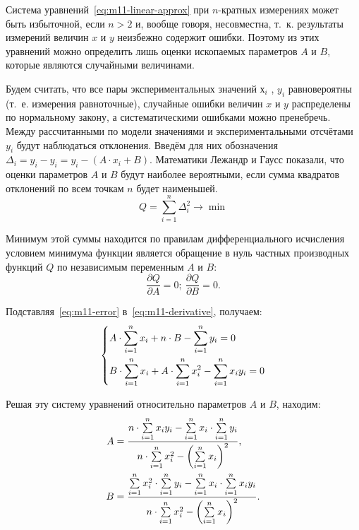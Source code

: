 \documentclass[a4paper, 12pt]{extarticle}
\newcommand{\isum}{\sum\limits_{i=1}^{n}}
\begin{document}
Система уравнений~\eqref{eq:m11-linear-approx} при $n$-кратных измерениях может быть избыточной, если $n >2$ и, вообще говоря, несовместна, т.~к. результаты измерений величин $x$ и $y$ неизбежно содержит ошибки. Поэтому из этих уравнений можно определить лишь оценки ископаемых параметров $A$ и $B$, которые являются случайными величинами. %

Будем считать, что все пары экспериментальных значений $х_i$ , $y_i$  равновероятны (т.~е. измерения равноточные), случайные ошибки величин $x$ и $y$ распределены по нормальному закону, а систематическими ошибками можно пренебречь. Между рассчитанными по модели значениями и экспериментальными отсчётами $y_i$ будут наблюдаться отклонения. Введём для них обозначения $\Delta_i = y_i - y_i = y_i - (A \cdot x_i + B)$. %
Математики Лежандр и Гаусс показали, что оценки параметров $A$ и $B$ будут наиболее вероятными, если сумма квадратов отклонений по всем точкам $n$ будет наименьшей. %
\begin{equation}
\label{eq:m11-error}
Q = \isum \Delta_i^2 \to \min
\end{equation}

Минимум этой суммы находится по правилам дифференциального исчисления условием минимума функции является обращение в нуль частных производных функций $Q$ по независимым переменным $A$ и $B$: 
\begin{equation}
\label{eq:m11-derivative}
\frac{\partial Q}{\partial A} = 0; \ \frac{\partial Q}{\partial B} = 0. %
\end{equation}

Подставляя~\eqref{eq:m11-error} в~\eqref{eq:m11-derivative}, получаем: %
\begin{equation}
\label{eq:m11-system}
\left\{ \aligned
&A \cdot \isum x_i + n \cdot B - \isum y_i = 0 \\ %
&B \cdot \isum x_i + A \cdot \isum x_i^2 - \isum x_i y_i = 0 %
\endaligned \right.
\end{equation}

Решая эту систему уравнений относительно параметров $A$ и $B$, находим: 
\begin{equation}
\label{eq:m11-solution} %
\aligned
A &= \frac{n \cdot \isum x_i y_i - \isum x_i \cdot \isum y_i}{n \cdot \isum x_i^2 - \left( \isum x_i \right)^2}, \\
B &= \frac{\isum x_i^2 \cdot \isum y_i - \isum x_i \cdot \isum x_i y_i}{n \cdot \isum x_i^2 - \left( \isum x_i \right)^2}. %
\endaligned
\end{equation}
\end{document}
